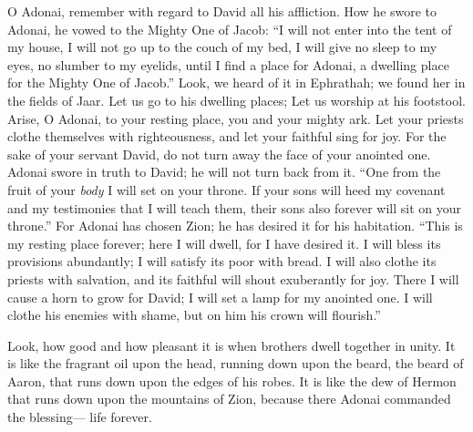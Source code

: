\begin{biblechapter} %
 O Adonai, remember with regard to David 
all his affliction.
\verse How he swore to Adonai, 
he vowed to the Mighty One of Jacob:
\verse “I will not enter into the tent of my house, 
I will not go up to the couch of my bed,
\verse I will give no sleep to my eyes, 
no slumber to my eyelids,
\verse until I find a place for Adonai, 
a dwelling place for the Mighty One of Jacob.”
\verse Look, we heard of it in Ephrathah; 
we found her in the fields of Jaar.
\verse Let us go to his dwelling places; 
Let us worship at his footstool.
\verse Arise, O Adonai, to your resting place, 
you and your mighty ark.
\verse Let your priests clothe themselves with righteousness, 
and let your faithful sing for joy.
\verse For the sake of your servant David, 
do not turn away the face of your anointed one.
\verse Adonai swore in truth to David; 
he will not turn back from it. 
“One from the fruit of your \textit{body} 
I will set on your throne.
\verse If your sons will heed my covenant 
and my testimonies that I will teach them, 
their sons also forever 
will sit on your throne.”
\verse For Adonai has chosen Zion; 
he has desired it for his habitation.
\verse “This is my resting place forever; 
here I will dwell, for I have desired it.
\verse I will bless its provisions abundantly; 
I will satisfy its poor with bread.
\verse I will also clothe its priests with salvation, 
and its faithful will shout exuberantly for joy.
\verse There I will cause a horn to grow for David; 
I will set a lamp for my anointed one.
\verse I will clothe his enemies with shame, 
but on him his crown will flourish.”
\end{biblechapter}

\begin{biblechapter} %
 Look, how good and how pleasant it is 
when brothers dwell together in unity.
\verse It is like the fragrant oil upon the head, 
running down upon the beard, the beard of Aaron, 
that runs down upon the edges of his robes.
\verse It is like the dew of Hermon that runs down 
upon the mountains of Zion, 
because there Adonai commanded the blessing— 
life forever.
\end{biblechapter}

